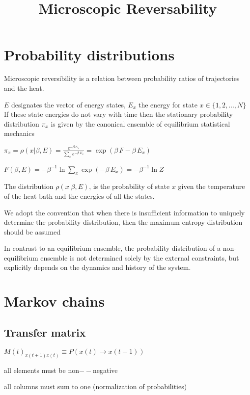 \documentclass{article}
\begin{document}
\title{Microscopic Reversability}
\author{}
\date{}
\maketitle

\section*{Probability distributions}

Microscopic reversibility is a relation between probability ratios of trajectories and the heat.

\(E\) designates the vector of energy states, \(E_x\) the energy for state \(x\in \{1,2,\ldots ,N\}\) \\
If these state energies do not vary with time then the stationary probability distribution \(\pi _x\) is given by the canonical ensemble of equilibrium
statistical mechanics

\(\pi _x=\rho (x|\beta ,E)=\frac{e^{-\beta \, E_x}}{\sum _x e^{-\beta \, E_x}}=\exp \left(\beta \, F-\beta \, E_x\right)\)

\(F(\beta ,E)=-\beta ^{-1}\ln  \sum _x  \exp \left(-\beta \, E_x\right)=-\beta ^{-1}\ln  Z\)

The distribution \(\rho (x|\beta ,E)\), is the probability of state \(x\) given the temperature of the heat bath and the energies of all the states.

We adopt the convention that when there is insufficient information to uniquely determine the probability distribution, then the maximum entropy
distribution should be assumed

In contrast to an equilibrium ensemble, the probability distribution of a non-equilibrium ensemble is not determined solely by the external constraints,
but explicitly depends on the dynamics and history of the system.

\section*{Markov chains}

\subsection*{Transfer matrix}

\(M(t)_{x(t+1)x(t)}\equiv P(x(t)\to x(t+1))\)

all elements must be non$--$negative

all columns must sum to one (normalization of probabilities)
\end{document}
